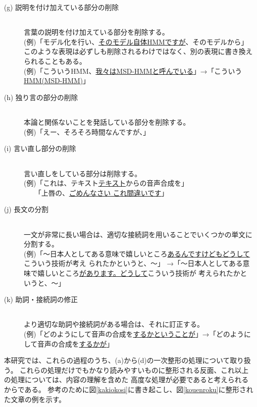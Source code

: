 \begin{description}
\item [(g) 説明を付け加えている部分の削除]  \verb+ +\\ 言葉の説明を付け加えている部分を削除する。\\
(例)「モデル化を行い、\underline{そのモデル自体HMMですが}、そのモデルから」\\
このような表現は必ずしも削除されるわけではなく、別の表現に書き換えられることもある。\\
(例)「こういうHMM、\underline{我々はMSD-HMMと呼んでいる}」→「こういう\underline{HMM(MSD-HMM)}」

\item [(h) 独り言の部分の削除] \verb+ +\\ 本論と関係ないことを発話している部分を削除する。\\
(例)「えー、そろそろ時間なんですが、」

\item [(i) 言い直し部分の削除] \verb+ +\\ 言い直しをしている部分は削除する。\\
(例)「これは、テキスト\underline{テキスト}からの音声合成を」\\
\verb+   +「上唇の、\underline{ごめんなさい これ間違いです}」

\item [(j) 長文の分割] \verb+ +\\ 一文が非常に長い場合は、適切な接続詞を用いることでいくつかの単文に分割する。\\
(例)「〜日本人としてある意味で嬉しいところ\underline{あるんですけどもどうして}こういう技術が考え
られたかというと、〜」
→「〜日本人としてある意味で嬉しいところ\underline{があります。どうして}こういう技術が
考えられたかというと、〜」

\item [(k) 助詞・接続詞の修正]\verb+ +\\ より適切な助詞や接続詞がある場合は、それに訂正する。\\
(例)「どのようにして音声の合成を\underline{するかということが}」→「どのようにして音声の合成を\underline{するかが}」

\end{description}

本研究では、これらの過程のうち、(a)から(d)の一次整形の処理について取り扱う。
これらの処理だけでもかなり読みやすいものに整形される反面、これ以上の処理については、内容の理解を含めた
高度な処理が必要であると考えられるからである。
参考のために図\ref{kakiokosi}に書き起こし、図\ref{kouenroku}に整形された文章の例を示す。

